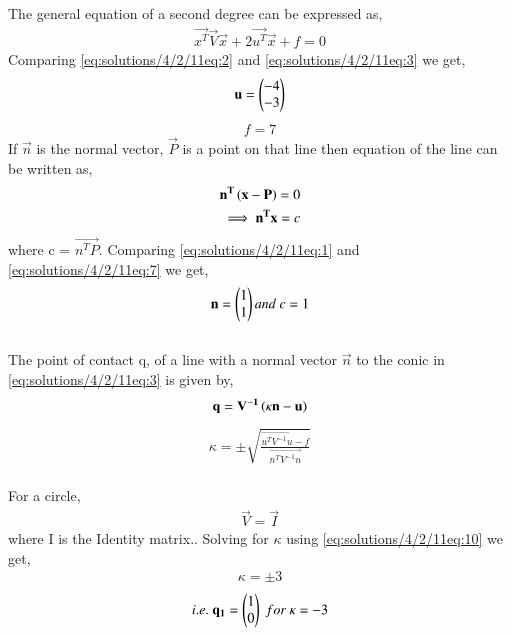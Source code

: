 The general equation of a second degree can be expressed as,
\begin{align}
\vec{x^T}\vec{V}\vec{x} + 2\vec{u^T}\vec{x} + f = 0 \label{eq:solutions/4/2/11eq:3}
\end{align}
Comparing \eqref{eq:solutions/4/2/11eq:2} and \eqref{eq:solutions/4/2/11eq:3} we get,
\begin{align}
\mathbf{u} = \begin{pmatrix}-4 \\ -3\end{pmatrix} \label{eq:solutions/4/2/11eq:4}
\end{align}
\begin{align}
f = 7 \label{eq:solutions/4/2/11eq:5}    
\end{align}
If $\vec{n}$ is the normal vector, $\vec{P}$ is a point on that line then equation of the line can be written as,
\begin{align}
\mathbf{n^T}\left(\mathbf{x-P}\right) = 0\\
\implies \mathbf{n^Tx} = c \label{eq:solutions/4/2/11eq:7}
\end{align}
 where c = $\vec{n^TP}$.
Comparing \eqref{eq:solutions/4/2/11eq:1} and \eqref{eq:solutions/4/2/11eq:7} we get,
\begin{align}
\mathbf{n} = \begin{pmatrix}1 \\ 1\end{pmatrix} and \ c = 1 \label{eq:solutions/4/2/11eq:8}
\end{align}\\
The point of contact q, of a line with a normal vector $\vec{n}$ to the conic in \eqref{eq:solutions/4/2/11eq:3} is given by,
\begin{align}
\mathbf{q} = \mathbf{V^{-1}}\left(\kappa\mathbf{n} - \mathbf{u}\right) \label{eq:solutions/4/2/11eq:9}
\end{align}
\begin{align}
\kappa = \pm \sqrt{\frac{\vec{u^TV^{-1}u}-f}{\vec{n^TV^{-1}n}}} \label{eq:solutions/4/2/11eq:10}
\end{align}\\
For a circle,
\begin{align}
\vec{V} = \vec{I} \label{eq:solutions/4/2/11eq:11}
\end{align}
where I is the Identity matrix..
Solving for $\kappa$ using \eqref{eq:solutions/4/2/11eq:10} we get,
\begin{align}
\kappa = \pm 3 \label{eq:solutions/4/2/11eq:12}
\end{align}
\begin{align}
i.e. \ \mathbf{q_1} = \begin{pmatrix}1 \\ 0\end{pmatrix} \ for \ \kappa = -3 \label{eq:solutions/4/2/11eq:13}
\end{align}
